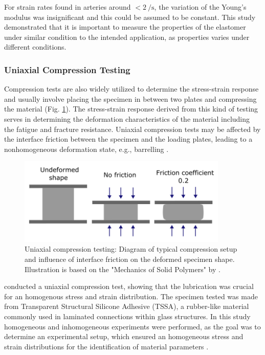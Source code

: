 For strain rates found in arteries around $<\SI[per-mode = symbol]{2}{\per \second}$, the variation of the
Young's modulus was insignificant and this could be assumed to be constant. This study demonstrated 
that it is important to measure the properties of the elastomer under similar condition to the
intended application, as properties varies under different conditions.

\subsubsection*{Uniaxial Compression Testing}
Compression tests are also widely utilized to determine the stress-strain response and 
usually involve placing the specimen in between two plates and compressing the material (Fig. \ref{fig:compressiondiag}).
The stress-strain response derived from this kind of testing serves in determining the deformation 
characteristics of the material including the fatigue and fracture resistance. 
Uniaxial compression tests may be affected by the interface friction between the specimen and 
the loading plates, leading to a nonhomogeneous deformation state, e.g., barrelling \cite{Bergström2015}.\\

\begin{figure}%
        \centering
       \quad
       \includegraphics[width=10cm]{Images/chapter1/compressiondiag.png}%
       \caption[Uniaxial compression testing setup based on the book by \citet{Bergström2015}]{Uniaxial compression testing: Diagram of typical compression setup and influence of interface friction on the deformed specimen shape. Illustration is based on the "Mechanics of Solid Polymers" by \citet{Bergström2015}.}%
       \label{fig:compressiondiag}%
\end{figure}

\citet{Drass2018} conducted a uniaxial compression test, showing that the lubrication was 
crucial for an homogenous stress and strain distribution. The specimen tested was made from Transparent Structural 
Silicone Adhesive (TSSA), a rubber-like material commonly used in laminated connections within glass structures.
In this study homogeneous and inhomogeneous experiments were performed, as the goal was to determine an 
experimental setup, which ensured an homogeneous stress and strain distributions for the identification of material parameters \cite{Drass2018}.

